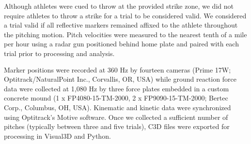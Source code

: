 \documentclass[
]{article}
\begin{document}
Although athletes were cued to throw at the provided strike zone, we did not require athletes to throw a strike for a trial to be considered valid. We considered a trial valid if all reflective markers remained affixed to the athlete throughout the pitching motion. Pitch velocities were measured to the nearest tenth of a mile per hour using a radar gun positioned behind home plate and paired with each trial prior to processing and analysis.

Marker positions were recorded at 360 Hz by fourteen cameras (Prime 17W; Optitrack/NaturalPoint Inc., Corvallis, OR, USA) while ground reaction force data were collected at 1,080 Hz by three force plates embedded in a custom concrete mound (1 x FP4080-15-TM-2000, 2 x FP9090-15-TM-2000; Bertec Corp., Columbus, OH, USA). Kinematic and kinetic data were synchronized using Optitrack's Motive software. Once we collected a sufficient number of pitches (typically between three and five trials), C3D files were exported for processing in Visual3D and Python.
\end{document}
